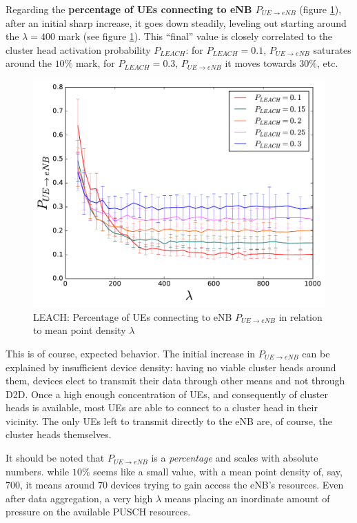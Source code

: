 Regarding the \textbf{percentage of UEs connecting to eNB $P_{UE\rightarrow eNB}$} (figure \ref{fig:LEACHLINES_2}), after an initial sharp increase, it goes down steadily, leveling out starting around the $\lambda = 400$ mark (see figure \ref{fig:LEACHLINES_2}). This ``final'' value is closely correlated to the cluster head activation probability $P_{LEACH}$: for $P_{LEACH} = 0.1$, $P_{UE\rightarrow eNB}$ saturates around the $10\%$ mark, for $P_{LEACH} = 0.3$, $P_{UE\rightarrow eNB}$ it moves towards $30\%$, etc. 

\begin{figure}
\centering
\captionsetup{justification=centering}
\includegraphics[width=0.7\linewidth]{figures/LEACHLINES_2}
\caption{LEACH: Percentage of UEs connecting to eNB $P_{UE\rightarrow eNB}$ in relation to mean point density $\lambda$ }
\label{fig:LEACHLINES_2}
\end{figure}

This is of course, expected behavior. The initial increase in $P_{UE\rightarrow eNB}$ can be explained by insufficient device density: having no viable cluster heads around them, devices elect to transmit their data through other means and not through D2D. Once a high enough concentration of UEs, and consequently of cluster heads is available, most UEs are able to connect to a cluster head in their vicinity. The only UEs left to transmit directly to the eNB are, of course, the cluster heads themselves.

It should be noted that $P_{UE\rightarrow eNB}$ is a \textit{percentage} and scales with absolute numbers. while $10\%$ seems like a small value, with a mean point density of, say, $700$, it means around 70 devices trying to gain access the eNB's resources. Even after data aggregation, a very high $\lambda$ means placing an inordinate amount of pressure on the available PUSCH resources.

